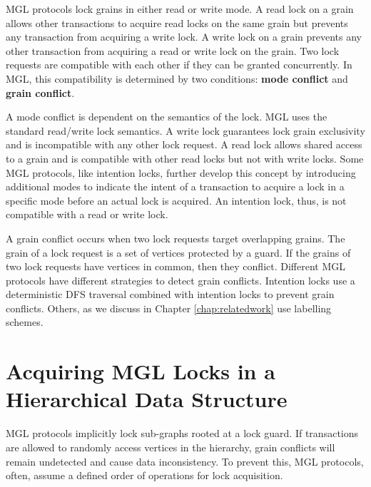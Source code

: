 MGL protocols lock grains in either read or write mode. A read lock on a grain allows other transactions to acquire read locks on the same grain but prevents any transaction from acquiring a write lock. A write lock on a grain prevents any other transaction from acquiring a read or write lock on the grain.
Two lock requests are compatible with each other if they can be granted concurrently. In MGL, this compatibility is determined by two conditions: \textbf{mode conflict} and \textbf{grain conflict}. 

A mode conflict is dependent on the semantics of the lock. MGL uses the standard read/write lock semantics. A write lock guarantees lock grain exclusivity and is incompatible with any other lock request. A read lock allows shared access to a grain and is compatible with other read locks but not with write locks. Some MGL protocols, like intention locks, further develop this concept by introducing additional modes to indicate the intent of a transaction to acquire a lock in a specific mode before an actual lock is acquired. An intention lock, thus, is not compatible with a read or write lock. 

A grain conflict occurs when two lock requests target overlapping grains. The grain of a lock request is a set of vertices protected by a guard. If the grains of two lock requests have vertices in common, then they conflict. Different MGL protocols have different strategies to detect grain conflicts. Intention locks use a deterministic DFS traversal combined with intention locks to prevent grain conflicts. Others, as we discuss in Chapter \ref{chap:relatedwork} use labelling schemes.


\section{Acquiring MGL Locks in a Hierarchical Data Structure} \label{sec:lockAcquisitionProtocol}
MGL protocols implicitly lock sub-graphs rooted at a lock guard. If transactions are allowed to randomly access vertices in the hierarchy, grain conflicts will remain undetected and cause data inconsistency. To prevent this, MGL protocols, often, assume a defined order of operations for lock acquisition. 

